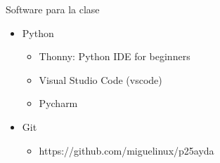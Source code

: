 \begin{frame}[c]{Software para la clase}
  \begin{itemize}
    \item Python
      \begin{itemize}
        \item Thonny: Python IDE for beginners
        \item Visual Studio Code (vscode)
        \item Pycharm
      \end{itemize}
    \item Git
      \begin{itemize}
        \item https://github.com/miguelinux/p25ayda
      \end{itemize}
  \end{itemize}
\end{frame}
